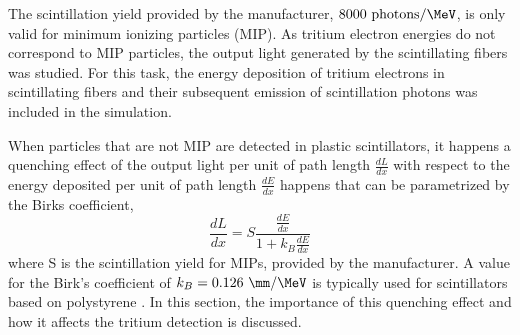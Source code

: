 The scintillation yield provided by the manufacturer, $8000~\text{photons}/\MeV$, is only valid for minimum ionizing particles (MIP). As tritium electron energies do not correspond to MIP particles, the output light generated by the scintillating fibers was studied. For this task, the energy deposition of tritium electrons in scintillating fibers and their subsequent emission of scintillation photons was included in the simulation.

When particles that are not MIP are detected in plastic scintillators, it happens a quenching effect of the output light per unit of path length $\frac{dL}{dx}$ with respect to the energy deposited per unit of path length $\frac{dE}{dx}$ happens that can be parametrized by the Birks coefficient\cite{BirksPaper},
\begin{equation}
\frac{dL}{dx}= S\frac{\displaystyle{\frac{dE}{dx}}}{1+k_B\displaystyle{\frac{dE}{dx}}}
\label{eq:birkscoefficient}
\end{equation}
where S is the scintillation yield for MIPs, provided by the manufacturer. A value for the Birk's coefficient of $k_B=0.126~\mm/\MeV$ is typically used for scintillators based on polystyrene \cite{BirksCoefficient}. In this section, the importance of this quenching effect and how it affects the tritium detection is discussed.


